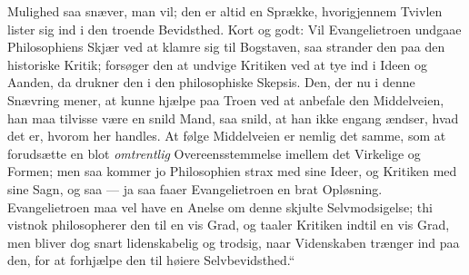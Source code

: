 \documentclass[12pt,a4paper]{book}
\begin{document}
Mulighed saa snæver, man vil;
den er altid en Sprække, hvorigjennem Tvivlen lister sig ind i den troende
Bevidsthed. Kort og godt: Vil Evangelietroen undgaae Philosophiens Skjær ved at
klamre sig til Bogstaven, saa strander den paa den historiske Kritik; forsøger
den at undvige Kritiken ved at tye ind i Ideen og Aanden, da drukner den i den
philosophiske Skepsis. Den, der nu i denne Snævring mener, at kunne hjælpe paa
Troen ved at anbefale den Middelveien, han maa tilvisse være en snild Mand, saa
snild, at han ikke engang ændser, hvad det er, hvorom her handles. At følge
Middelveien er nemlig det samme, som at forudsætte en blot \emph{omtrentlig}
Overeensstemmelse imellem det Virkelige og Formen; men saa kommer jo
Philosophien strax med sine Ideer, og Kritiken med sine Sagn, og saa --- ja saa
faaer Evangelietroen en brat Opløsning. Evangelietroen maa vel have en Anelse om
denne skjulte Selvmodsigelse; thi vistnok philosopherer den til en vis Grad, og
taaler Kritiken indtil en vis Grad, men bliver dog snart lidenskabelig og
trodsig, naar Videnskaben trænger ind paa den, for at forhjælpe den til høiere
Selvbevidsthed.“
\end{document}
